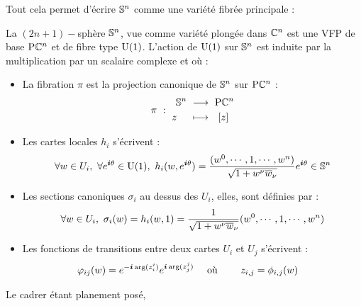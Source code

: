Tout cela permet d'écrire $\S{n}$ comme une variété fibrée principale :
\begin{proposition}
	La $(2n+1)-$sphère $\S{n}$, vue comme variété plongée dans $\C^n$ est une VFP de base $\PC{n}$ et de fibre type $\U{1}$. L'action de $\U{1}$ sur $\S{n}$ est induite par la multiplication par un scalaire complexe et où :
	\begin{itemize}
		\item La fibration $\pi$ est la projection canonique de $\S{n}$ sur $\PC{n}$ :
		\begin{equation}
			\pi\ :\ \begin{aligned} \S{n}\ &\lr\ \PC{n} \\ z\quad\ &\lmt\ \ [z]\end{aligned}
		\end{equation}
		
		\item Les cartes locales $h_i$ s'écrivent :
		\begin{equation}
			\forall w \in U_i,\ \forall e^{\i \theta}\in\U{1},\  h_i(w,e^{\i \theta}) = \frac{(w^0,\cdots, 1,\cdots, w^n)}{\sqrt{1 + w^\nu \congu{w}_\nu}}e^{\i \theta} \in \S{n}
		\end{equation}
		
		\item Les sections canoniques $\sigma_i$ au dessus des $U_i$, elles,  sont définies par :
		\begin{equation}
			\forall w \in U_i,\ \sigma_i(w) = h_i(w, 1) = \frac{1}{\sqrt{1 + w^\nu \congu{w}_\nu}}(w^0,\cdots, 1,\cdots, w^n)
		\end{equation}
		
		\item Les fonctions de transitions entre deux cartes $U_i$ et $U_j$ s'écrivent :
		\begin{align}
			\varphi_{ij}(w) &= e^{-\i  \arg (z_i^i)} e^{\i  \arg (z_j^j)}  &  \text{ où }&\qquad z_{i,j} = \phi_{i,j}(w)
		\end{align}
	\end{itemize}
\end{proposition}
\skipl

Le cadrer étant planement posé, 




